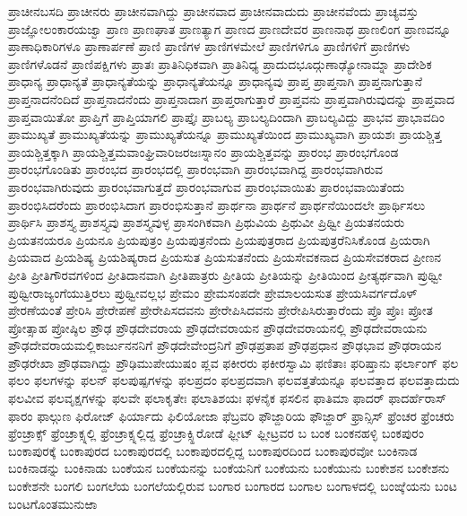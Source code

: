 {ಪ್ರಾಚೀನಬಸದಿ
ಪ್ರಾಚೀನರು
ಪ್ರಾಚೀನವಾಗಿದ್ದು
ಪ್ರಾಚೀನವಾದ
ಪ್ರಾಚೀನವಾದುದು
ಪ್ರಾಚೀನವೆಂದು
ಪ್ರಾಚ್ಯವಸ್ತು
ಪ್ರಾಜ್ಞೋಲಂಕಾರಯಜ್ವಾ
ಪ್ರಾಣ
ಪ್ರಾಣಘಾತ
ಪ್ರಾಣತ್ಯಾಗ
ಪ್ರಾಣದ
ಪ್ರಾಣದೇವರ
ಪ್ರಾಣನಾಥ
ಪ್ರಾಣಲಿಂಗ
ಪ್ರಾಣವನ್ನೂ
ಪ್ರಾಣಾಧಿಕಾರಿಗಳೂ
ಪ್ರಾಣಾರ್ಪಣೆ
ಪ್ರಾಣಿ
ಪ್ರಾಣಿಗಳ
ಪ್ರಾಣಿಗಳಮೇಲೆ
ಪ್ರಾಣಿಗಳಿಗೂ
ಪ್ರಾಣಿಗಳಿಗೆ
ಪ್ರಾಣಿಗಳು
ಪ್ರಾಣಿಗಳೊಡನೆ
ಪ್ರಾಣಿಪಕ್ಷಿಗಳು
ಪ್ರಾತಃ
ಪ್ರಾತಿನಿಧಿಕವಾಗಿ
ಪ್ರಾತಿನಿಧ್ಯ
ಪ್ರಾದುದಭೂದ್ಗುಣಾಢ್ಯೋನಾಮ್ನಾ
ಪ್ರಾದೇಶಿಕ
ಪ್ರಾಧಾನ್ಯ
ಪ್ರಾಧಾನ್ಯತೆ
ಪ್ರಾಧಾನ್ಯತೆಯನ್ನು
ಪ್ರಾಧಾನ್ಯತೆಯನ್ನೂ
ಪ್ರಾಧಾನ್ಯವು
ಪ್ರಾಪ್ತ
ಪ್ರಾಪ್ತನಾಗಿ
ಪ್ರಾಪ್ತನಾಗುತ್ತಾನೆ
ಪ್ರಾಪ್ತನಾದನೆಂದಿದೆ
ಪ್ರಾಪ್ತನಾದನೆಂದು
ಪ್ರಾಪ್ತನಾದಾಗ
ಪ್ರಾಪ್ತರಾಗುತ್ತಾರೆ
ಪ್ರಾಪ್ತವನು
ಪ್ರಾಪ್ತವಾಗಿರುವುದನ್ನು
ಪ್ರಾಪ್ತವಾದ
ಪ್ರಾಪ್ತವಾಯಿತೋ
ಪ್ರಾಪ್ತಿಗೆ
ಪ್ರಾಪ್ತಿಯಾಗಲಿ
ಪ್ರಾಪ್ತೈಃ
ಪ್ರಾಬಲ್ಯ
ಪ್ರಾಬಲ್ಯದಿಂದಾಗಿ
ಪ್ರಾಬಲ್ಯವಿದ್ದು
ಪ್ರಾಭವ
ಪ್ರಾಭಾವದಿಂ
ಪ್ರಾಮುಖ್ಯತೆ
ಪ್ರಾಮುಖ್ಯತೆಯನ್ನು
ಪ್ರಾಮುಖ್ಯತೆಯನ್ನೂ
ಪ್ರಾಮುಖ್ಯತೆಯಿಂದ
ಪ್ರಾಮುಖ್ಯವಾಗಿ
ಪ್ರಾಯಶಃ
ಪ್ರಾಯಶ್ಚಿತ್ತ
ಪ್ರಾಯಶ್ಚಿತ್ತಕ್ಕಾಗಿ
ಪ್ರಾಯಶ್ಚಿತ್ತಮವಾಂಘ್ರಿವಾರಿಜರಜಃಸ್ನಾನಂ
ಪ್ರಾಯಶ್ಚಿತ್ತವನ್ನು
ಪ್ರಾರಂಭ
ಪ್ರಾರಂಭಗೊಂಡ
ಪ್ರಾರಂಭಗೊಂಡಿತು
ಪ್ರಾರಂಭದ
ಪ್ರಾರಂಭದಲ್ಲಿ
ಪ್ರಾರಂಭವಾಗಿ
ಪ್ರಾರಂಭವಾಗಿದ್ದ
ಪ್ರಾರಂಭವಾಗಿರುವ
ಪ್ರಾರಂಭವಾಗಿರುವುದು
ಪ್ರಾರಂಭವಾಗುತ್ತದೆ
ಪ್ರಾರಂಭವಾಗುವ
ಪ್ರಾರಂಭವಾಯಿತು
ಪ್ರಾರಂಭವಾಯಿತೆಂದು
ಪ್ರಾರಂಭಿಸಿದರೆಂದು
ಪ್ರಾರಂಭಿಸಿದಾಗ
ಪ್ರಾರಂಭಿಸುತ್ತಾನೆ
ಪ್ರಾರ್ಥನಾ
ಪ್ರಾರ್ಥನೆ
ಪ್ರಾರ್ಥನೆಯಿಂದಲೇ
ಪ್ರಾರ್ಥಿಸಲು
ಪ್ರಾರ್ಥಿಸಿ
ಪ್ರಾಶಸ್ತ್ಯ
ಪ್ರಾಶಸ್ತ್ಯವು
ಪ್ರಾಶಸ್ತ್ಯವುಳ್ಳ
ಪ್ರಾಸಂಗಿಕವಾಗಿ
ಪ್ರಿಥುವಿಯ
ಪ್ರಿಥುವೀ
ಪ್ರಿಥ್ವೀ
ಪ್ರಿಯತನಯರು
ಪ್ರಿಯತನಯರೂ
ಪ್ರಿಯನೂ
ಪ್ರಿಯಪುತ್ರಂ
ಪ್ರಿಯಪುತ್ರನೆಂದು
ಪ್ರಿಯಪುತ್ರರಾದ
ಪ್ರಿಯಪುತ್ರರೆನಿಸಿಕೊಂಡ
ಪ್ರಿಯರಾಗಿ
ಪ್ರಿಯವಾದ
ಪ್ರಿಯಶಿಷ್ಯ
ಪ್ರಿಯಶಿಷ್ಯರಾದ
ಪ್ರಿಯಸುತ
ಪ್ರಿಯಸುತನೆಂದು
ಪ್ರಿಯಸೇವಕನಾದ
ಪ್ರಿಯಸೇವಕರಾದ
ಪ್ರೀಣನ
ಪ್ರೀತಿ
ಪ್ರೀತಿಗೌರವಗಳಿಂದ
ಪ್ರೀತಿದಾನವಾಗಿ
ಪ್ರೀತಿಪಾತ್ರರು
ಪ್ರೀತಿಯ
ಪ್ರೀತಿಯನ್ನು
ಪ್ರೀತಿಯಿಂದ
ಪ್ರೀತ್ಯರ್ಥವಾಗಿ
ಪ್ರುಥ್ವೀ
ಪ್ರುಥ್ವೀರಾಜ್ಯಂಗೆಯುತ್ತಿರಲು
ಪ್ರುಥ್ವೀವಲ್ಲಭ
ಪ್ರೇಮಂ
ಪ್ರೇಮಸಂಪದೇ
ಪ್ರೇಮಾಲಯಸುತ
ಪ್ರೇಯಸಿವರ್ಗದೊಳ್
ಪ್ರೇರಣೆಯಂತೆ
ಪ್ರೇರಿಸಿ
ಪ್ರೇರೇಪಣೆ
ಪ್ರೇರೇಪಿಸದವನು
ಪ್ರೇರೇಪಿಸಿದವನು
ಪ್ರೇರೇಪಿಸಿರುತ್ತಾರೆಂದು
ಪ್ರೊ
ಪ್ರೊಃ
ಪ್ರೋತ
ಪ್ರೋತ್ಸಾಹ
ಪ್ರೋಷ್ಠಿಲ
ಪ್ರೌಢ
ಪ್ರೌಢದೇವರಾಯ
ಪ್ರೌಢದೇವರಾಯನ
ಪ್ರೌಢದೇವರಾಯನಲ್ಲಿ
ಪ್ರೌಢದೇವರಾಯನು
ಪ್ರೌಢದೇವರಾಯಮಲ್ಲಿಕಾರ್ಜುನನನಿಗೆ
ಪ್ರೌಢದೇವೇಂದ್ರನಿಗೆ
ಪ್ರೌಢಪ್ರತಾಪ
ಪ್ರೌಢಪ್ರಧಾನ
ಪ್ರೌಢಭಾವ
ಪ್ರೌಢರಾಯನ
ಪ್ರೌಢರೇಖಾ
ಪ್ರೌಢವಾಗಿದ್ದು
ಪ್ರೌಢಿಮುಪೇಯುಷಂ
ಪ್ಲವ
ಫಕೀರರು
ಫಕೀರಸ್ವಾಮಿ
ಫಣಿತಾಃ
ಫರಿಷ್ತಾನು
ಫರ್ಲಾಂಗ್
ಫಲ
ಫಲಂ
ಫಲಗಳನ್ನು
ಫಲನ್
ಫಲಪುಷ್ಪಗಳನ್ನು
ಫಲಪ್ರದಂ
ಫಲಪ್ರದವಾಗಿ
ಫಲವತ್ತತೆಯನ್ನೂ
ಫಲವತ್ತಾದ
ಫಲವತ್ತಾದುದು
ಫಲವೀವ
ಫಲವೃಕ್ಷಗಳನ್ನು
ಫಲವೇ
ಫಲಾಕೃತೇಃ
ಫಲಾತಿಶಯಃ
ಫಳನೈಕ
ಫಸಲಿನ
ಫಾತಿಮಾ
ಫಾದರ್
ಫಾದರ್ಹೆರಾಸ್
ಫಾರಂ
ಫಾಲ್ಗುಣ
ಫಿರೋಜ್
ಫಿರ್ಯಾದು
ಫಿಲಿಯೋಜಾ
ಫೆಬ್ರವರಿ
ಫೌಜ್ದಾರಿಯ
ಫೌಜ್ದಾರ್
ಫ್ರಾನ್ಸಿಸ್
ಫ್ರೆಂಚರ
ಫ್ರೆಂಚರು
ಫ್ರೆಂಚ್ರಾಕ್ಸ್
ಫ್ರೆಂಚ್ರಾಕ್ಸ್ನಲ್ಲಿ
ಫ್ರೆಂಚ್ರಾಕ್ಸ್ನಲ್ಲಿದ್ದ
ಫ್ರೆಂಚ್ರಾಕ್ಸ್ಹಿರೋಡೆ
ಫ್ಲೀಟ್
ಫ್ಲೀಟ್ರವರ
ಬ
ಬಂಕ
ಬಂಕನಹಳ್ಳಿ
ಬಂಕಪುರಂ
ಬಂಕಾಪುರಕ್ಕೆ
ಬಂಕಾಪುರದ
ಬಂಕಾಪುರದಲ್ಲಿ
ಬಂಕಾಪುರದಲ್ಲಿದ್ದ
ಬಂಕಾಪುರದಿಂದ
ಬಂಕಾಪುರವೋ
ಬಂಕಿನಾಡ
ಬಂಕಿನಾಡನ್ನು
ಬಂಕಿನಾಡು
ಬಂಕೆಯನ
ಬಂಕೆಯನನ್ನು
ಬಂಕೆಯನಿಗೆ
ಬಂಕೆಯನು
ಬಂಕೆಯುನು
ಬಂಕೇಶನ
ಬಂಕೇಶನು
ಬಂಕೇಶನೇ
ಬಂಗಲಿ
ಬಂಗಲೆಯ
ಬಂಗಲೆಯಲ್ಲಿರುವ
ಬಂಗಾರ
ಬಂಗಾರದ
ಬಂಗಾಲ
ಬಂಗಾಳದಲ್ಲಿ
ಬಂಙ್ಕೆಯನು
ಬಂಟ
ಬಂಟಗೊಂತಮುನುಱಾ
}
